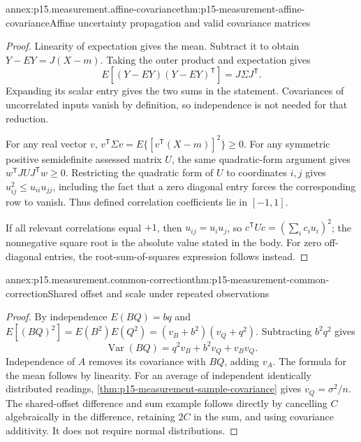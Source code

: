 \begin{annexitem}{annex:p15.measurement.affine-covariance}{thm:p15-measurement-affine-covariance}{Affine uncertainty propagation and valid covariance matrices}
\begin{proof}
Linearity of expectation gives the mean. Subtract it to obtain
\(Y-EY=J(X-m)\). Taking the outer product and expectation gives
\[
 E[(Y-EY)(Y-EY)^{\mathsf T}]=J\Sigma J^{\mathsf T}.
\]
Expanding its scalar entry gives the two sums in the statement.
Covariances of uncorrelated inputs vanish by definition, so independence
is not needed for that reduction.

For any real vector \(v\),
\(v^{\mathsf T}\Sigma v=E\{[v^{\mathsf T}(X-m)]^2\}\geq0\).
For any symmetric positive semidefinite assessed matrix \(U\), the same
quadratic-form argument gives
\(w^{\mathsf T}JUJ^{\mathsf T}w\geq0\). Restricting the quadratic form
of \(U\) to coordinates \(i,j\) gives
\(u_{ij}^2\leq u_{ii}u_{jj}\), including the fact that a zero diagonal
entry forces the corresponding row to vanish. Thus defined correlation
coefficients lie in \([-1,1]\).

If all relevant correlations equal \(+1\), then
\(u_{ij}=u_i u_j\), so
\(c^{\mathsf T}Uc=(\sum_i c_i u_i)^2\); the nonnegative square root
is the absolute value stated in the body. For zero off-diagonal entries,
the root-sum-of-squares expression follows instead.
\end{proof}
\end{annexitem}

\begin{annexitem}{annex:p15.measurement.common-correction}{thm:p15-measurement-common-correction}{Shared offset and scale under repeated observations}
\begin{proof}
By independence \(E(BQ)=bq\) and
\(E[(BQ)^2]=E(B^2)E(Q^2)=(v_B+b^2)(v_Q+q^2)\).
Subtracting \(b^2q^2\) gives
\[
 \operatorname{Var}(BQ)=q^2v_B+b^2v_Q+v_Bv_Q.
\]
Independence of \(A\) removes its covariance with \(BQ\), adding \(v_A\).
The formula for the mean follows by linearity.
For an average of independent identically distributed readings,
\cref{thm:p15-measurement-sample-covariance} gives \(v_Q=\sigma^2/n\).
The shared-offset difference and sum example follows directly by cancelling
\(C\) algebraically in the difference, retaining \(2C\) in the sum, and
using covariance additivity. It does not require normal distributions.
\end{proof}
\end{annexitem}

